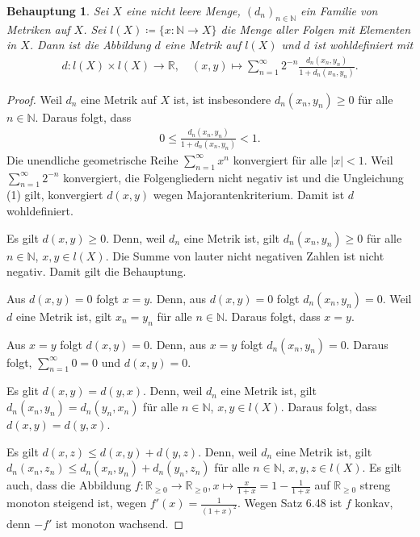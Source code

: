 \documentclass[draft,a5paper]{article}
\newtheorem*{beh}{Behauptung}
\begin{document}
\begin{beh}
  Sei \(X\) eine nicht leere Menge, \((d_{n})_{n \in \mathbb{N}}\) ein Familie
  von Metriken auf \(X\).  Sei \(l(X) \coloneq \{x \colon \mathbb{N} \to X\}\) die Menge
  aller Folgen mit Elementen in \(X\).  Dann ist die Abbildung \(d\)
  eine Metrik auf \(l(X)\) und \(d\) ist wohldefiniert mit
  \begin{align*}
    d \colon l(X) \times l(X) \to \mathbb{R}, \quad (x, y) \mapsto
    \sum_{n=1}^{\infty}{2^{-n}\frac{d_{n}(x_{n}, y_{n})}{1+d_{n}(x_{n}, y_{n})}}.
  \end{align*}
\end{beh}

\begin{proof}
  Weil \(d_{n}\) eine Metrik auf \(X\) ist, ist insbesondere
  \(d_{n}(x_{n},y_{n}) \ge 0\) für alle \(n \in \mathbb{N}\).  Daraus folgt, dass
  \begin{align*}
    0 \le \frac{d_{n}(x_{n}, y_{n})}{1+d_{n}(x_{n}, y_{n})} < 1. \tag{1}
  \end{align*}
  Die unendliche geometrische Reihe \(\sum_{n=1}^{\infty}{x^{n}}\) konvergiert
  für alle \(|x| < 1\).  Weil \(\sum_{n=1}^{\infty}{2^{-n}}\) konvergiert, die
  Folgengliedern nicht negativ ist und die Ungleichung (1) gilt,
  konvergiert \(d(x,y)\) wegen Majorantenkriterium. Damit ist \(d\)
  wohldefiniert.

  Es gilt \(d(x,y) \ge 0\).  Denn, weil \(d_{n}\) eine Metrik ist, gilt
  \(d_{n}(x_{n}, y_{n}) \ge 0\) für alle \(n \in \mathbb{N}\), \(x, y \in l(X)\).
  Die Summe von lauter nicht negativen Zahlen ist nicht negativ.
  Damit gilt die Behauptung.

  Aus \(d(x, y) = 0\) folgt \(x = y\).  Denn, aus \(d(x, y) = 0\)
  folgt \(d_{n}(x_{n}, y_{n}) = 0\).  Weil \(d\) eine Metrik ist, gilt
  \(x_{n} = y_{n}\) für alle \(n \in \mathbb{N}\).  Daraus folgt, dass \(x = y\).

  Aus \(x = y\) folgt \(d(x, y) = 0\).  Denn, aus \(x = y\) folgt
  \(d_{n}(x_{n}, y_{n}) = 0\).  Daraus folgt, \(\sum_{n=1}^{\infty}{0} = 0\)
  und \(d(x, y) = 0\).

  Es glit \(d(x, y) = d(y, x)\). Denn, weil \(d_{n}\) eine Metrik ist,
  gilt \(d_{n}(x_{n}, y_{n}) = d_{n}(y_{n}, x_{n})\) für alle
  \(n \in \mathbb{N}\), \(x, y \in l(X)\).  Daraus folgt, dass
  \(d(x, y) = d(y, x)\).

  Es gilt \(d(x, z) \le d(x, y) + d(y, z)\). Denn, weil \(d_{n}\) eine
  Metrik ist, gilt
  \(d_{n}(x_{n}, z_{n}) \le d_{n}({x_{n}, y_{n}}) + d_{n}({y_{n},
    z_{n}})\) für alle \(n \in \mathbb{N}\), \(x, y, z \in l(X)\).  Es gilt auch,
  dass die Abbildung
  \(f \colon \mathbb{R}_{\ge 0} \to \mathbb{R}_{\ge 0}, x \mapsto \frac{x}{1+x} = 1 - \frac{1}{1+x}\) auf
  \(\mathbb{R}_{\ge 0}\) streng monoton steigend ist, wegen
  \(f'(x) = \frac{1}{(1+x)^{2}}\).  Wegen Satz 6.48 ist \(f\) konkav,
  denn \(-f'\) ist monoton wachsend.


\end{proof}
\end{document}
